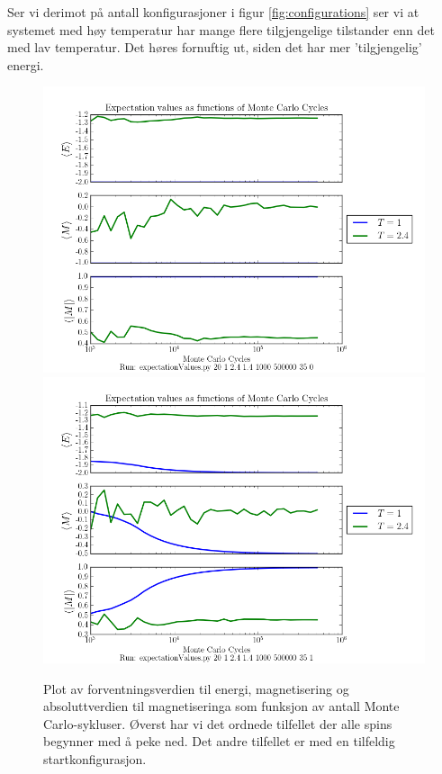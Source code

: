 \documentclass[11pt]{article}
\begin{document}
Ser vi derimot på antall konfigurasjoner i figur \ref{fig:configurations} ser vi at systemet med høy temperatur
har mange flere tilgjengelige tilstander enn det med lav temperatur. Det høres fornuftig ut, siden det har mer
'tilgjengelig' energi.

\begin{figure}[ht]
  \centering
  \includegraphics[scale=0.7]{../fig/E_M_Mabs.png}
  \includegraphics[scale=0.7]{../fig/E_M_Mabs_random.png}
  \caption{Plot av forventningsverdien til energi,
    magnetisering og absoluttverdien til magnetiseringa som funksjon av antall Monte Carlo-sykluser. 
    Øverst har vi det ordnede tilfellet der alle spins begynner med å peke ned. Det andre tilfellet er 
    med en tilfeldig startkonfigurasjon.}
\label{fig:forventningsverdi}
\end{figure}
\end{document}
